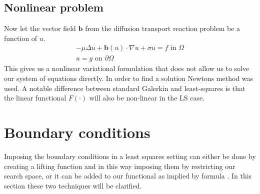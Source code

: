 \subsection{Nonlinear problem}
Now let the vector field $\mathbf{b}$ from the diffusion transport reaction problem be a function of $u$. 
\begin{align}
	-\mu \Delta u + \mathbf{b}(u) \cdot \nabla u +\sigma u = f \text{ in } \Omega \\
	u = g \text{ on } \partial \Omega
	\label{eq:DiffTransNonLin}
\end{align}
This gives us a nonlinear variational formulation that does not allow us to solve our system of equations directly. In order to find a solution Newtons method was used. A notable difference between standard Galerkin and least-squares is that the linear functional $F(\cdot)$ will also be non-linear in the LS case.
\section{Boundary conditions} \label{BC}
Imposing the boundary conditions in a least squares setting can either be done by creating a lifting function and in this way imposing them by restricting our search space, or it can be added to our functional as implied by formula . In this section these two techniques will be clarified. 
